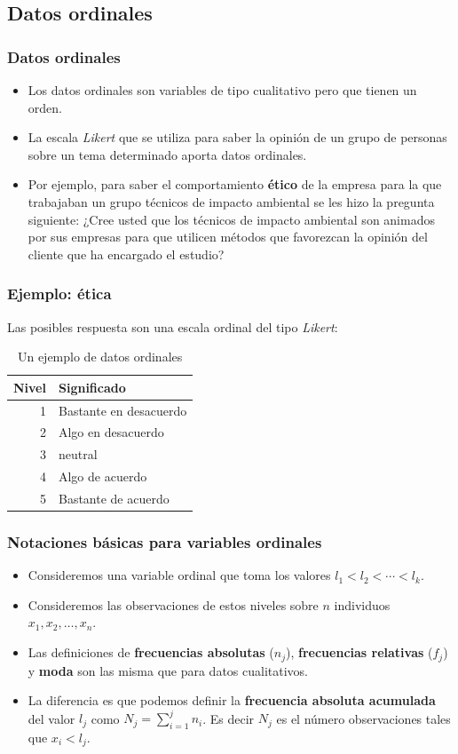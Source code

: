 \subsection{Datos ordinales}
\begin{frame}
\frametitle{Datos ordinales}
\begin{itemize}
\item Los datos ordinales son variables de tipo cualitativo pero que tienen un orden.
\item  La escala \textsl{Likert} que se utiliza para saber la opinión de un grupo de personas sobre un tema determinado aporta datos
ordinales.
\item Por ejemplo, para saber  el comportamiento \textbf{ético} de la empresa para la que trabajaban un grupo  técnicos de impacto ambiental se les hizo la pregunta siguiente: ¿Cree usted que los técnicos de  impacto ambiental son animados por sus empresas para que  utilicen métodos que favorezcan la opinión del cliente que ha encargado el estudio?
\end{itemize}
\end{frame}

\begin{frame}
\frametitle{Ejemplo: ética}
Las posibles respuesta son una escala ordinal del tipo \textsl{Likert}:
\begin{table}[h]
\begin{center}
\caption{Un ejemplo de datos ordinales}
\begin{tabular}{|r|l|}
\hline
 Nivel  & Significado\\\hline
1 & Bastante en desacuerdo\\
2 & Algo en desacuerdo \\
3 & neutral\\
4 & Algo de acuerdo\\
5 & Bastante de acuerdo\\\hline
\end{tabular}
\end{center}
\end{table}
\end{frame}

\begin{frame}
\frametitle{Notaciones básicas para variables ordinales}


\begin{itemize}
\item Consideremos una variable ordinal que toma los valores $l_1< l_2<\cdots < l_k$.
\item Consideremos las observaciones de estos niveles sobre $n$ individuos \break $x_1,x_2,\ldots,x_n$.
 \item  Las definiciones de \textbf{frecuencias absolutas} ($n_j$), \textbf{frecuencias relativas} ($f_j$) y \textbf{moda} son las misma que para datos cualitativos.
\item La diferencia es que podemos definir la \textbf{frecuencia absoluta acumulada} del valor $l_j$ como $N_j=\sum_{i=1}^j n_i$. Es decir $N_j$ es el número observaciones tales que $x_i< l_j$.
\end{itemize}
\end{frame}

